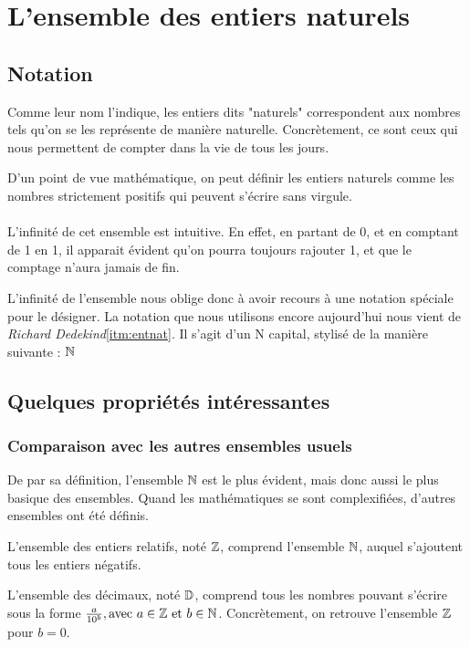 \section{L'ensemble des entiers naturels}

\subsection{Notation}

Comme leur nom l'indique, les entiers dits "naturels" correspondent aux nombres tels qu'on se les représente de manière naturelle.
Concrètement, ce sont ceux qui nous permettent de compter dans la vie de tous les jours.

D'un point de vue mathématique, on peut définir les entiers naturels comme les nombres strictement positifs qui peuvent s'écrire sans virgule.\\
\\

L'infinité de cet ensemble est intuitive. En effet, en partant de 0, et en comptant de 1 en 1, il apparait évident qu'on pourra toujours rajouter 1, et que le comptage n'aura jamais de fin.

L'infinité de l'ensemble nous oblige donc à avoir recours à une notation spéciale pour le désigner. La notation que nous utilisons encore aujourd'hui nous vient de \textit{Richard Dedekind}\ref{itm:entnat}. Il s'agit d'un N capital, stylisé de la manière suivante : 
$\mathbb{N}$

\subsection{Quelques propriétés intéressantes}
\subsubsection{Comparaison avec les autres ensembles usuels}

De par sa définition, l'ensemble $\mathbb{N}$ est le plus évident, mais donc aussi le plus basique des ensembles. Quand les mathématiques se sont complexifiées, d'autres ensembles ont été définis.

L'ensemble des entiers relatifs, noté $\mathbb{Z}$, comprend l'ensemble $\mathbb{N}$, auquel s'ajoutent tous les entiers négatifs.

L'ensemble des décimaux, noté $\mathbb{D}$, comprend tous les nombres pouvant s'écrire sous la forme $\frac{a}{10^b}, \text{avec} \ a \in \mathbb{Z} \ \text{et} \ b \in \mathbb{N}$.
Concrètement, on retrouve l'ensemble $\mathbb{Z}$ pour $b = 0$. 

